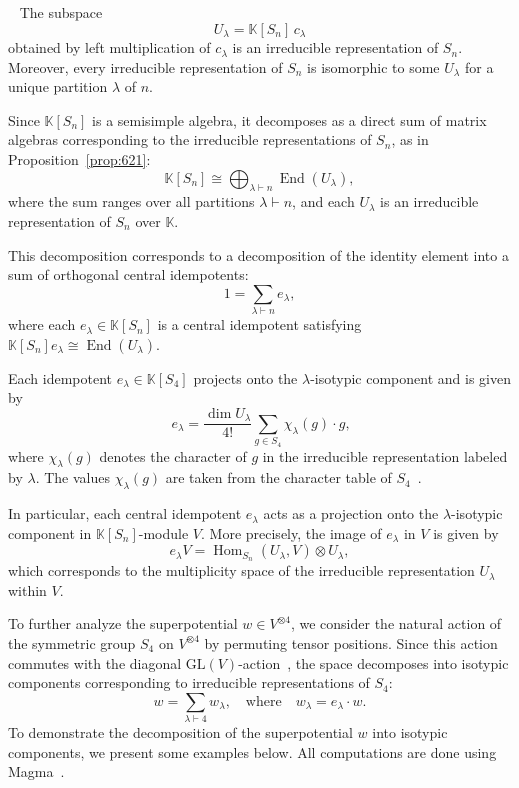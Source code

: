 \documentclass{amsart}
\begin{document}
\begin{theorem}~\cite[Theorem 4.36]{etingof2011introductionrepresentationtheory}\label{thm:641ksn}
The subspace
\[
U_\lambda = \mathbb{K}[S_n] \, c_\lambda
\]
obtained by left multiplication of $c_\lambda$ is an irreducible representation of $S_n$. Moreover, every irreducible representation of $S_n$ is isomorphic to some $U_\lambda$ for a unique partition $\lambda$ of $n$.
\end{theorem}
Since \(\mathbb{K}[S_n]\) is a semisimple algebra, it decomposes as a direct sum of matrix algebras corresponding to the irreducible representations of \(S_n\), as in Proposition~\ref{prop:621}:
$$ \mathbb{K}[S_n] \cong \bigoplus_{\lambda \vdash n} \operatorname{End}(U_\lambda),$$
where the sum ranges over all partitions \(\lambda \vdash n\), and each \(U_\lambda\) is an irreducible representation of \(S_n\) over \(\mathbb{K}\).

This decomposition corresponds to a decomposition of the identity element into a sum of orthogonal central idempotents:
\[
1 = \sum_{\lambda \vdash n} e_\lambda,
\]
where each \(e_\lambda \in \mathbb{K}[S_n]\) is a central idempotent satisfying $\mathbb{K}[S_n] e_\lambda \cong \operatorname{End}(U_\lambda).$

Each idempotent \( e_\lambda \in \mathbb{K}[S_4] \) projects onto the \( \lambda \)-isotypic component and is given by
\begin{equation*}~\label{eqchformula}
e_\lambda = \frac{\dim U_{\lambda}}{4!} \sum_{g \in S_4} \chi_\lambda(g) \cdot g,
\end{equation*}
where \( \chi_\lambda(g) \) denotes the character of \( g \) in the irreducible representation labeled by \( \lambda \). The values \( \chi_\lambda(g) \) are taken from the character table of \( S_4 \)~\cite[page 19]{fulton1991representation}.

In particular, each central idempotent \(e_\lambda\) acts as a projection onto the \(\lambda\)-isotypic component in \(\mathbb{K}[S_n]\)-module \(V\). More precisely, the image of \(e_\lambda\) in \(V\) is given by
\[
e_\lambda V = \operatorname{Hom}_{S_n}(U_\lambda, V) \otimes U_\lambda,
\]
which corresponds to the multiplicity space of the irreducible representation \(U_\lambda\) within \(V\).

To further analyze the superpotential \( w \in V^{\otimes 4} \), we consider the natural action of the symmetric group \( S_4 \) on \( V^{\otimes 4} \) by permuting tensor positions. Since this action commutes with the diagonal \( \mathrm{GL}(V) \)-action~\cite[page 76]{fulton1991representation}, the space decomposes into isotypic components corresponding to irreducible representations of \( S_4 \):
$$ w = \sum_{\lambda \vdash 4} w_\lambda, \quad \text{where} \quad w_\lambda = e_\lambda \cdot w.$$
To demonstrate the decomposition of the superpotential $w$ into isotypic components, we present some examples below.
All computations are done using Magma~\cite{vishal2025}.
\end{document}
